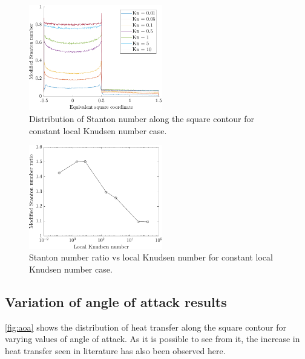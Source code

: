 \begin{figure}[H]
    \centering
    \includegraphics[width=0.52\textwidth]{Images/4. Results/local/stsec.pdf}
    \caption{Distribution of Stanton number along the square contour for constant local Knudsen number case.}
    \label{fig:localstsec}
\end{figure}

\begin{figure}[H]
    \centering
    \includegraphics[width=0.52\textwidth]{Images/4. Results/local/stkn.pdf}
    \caption{Stanton number ratio vs local Knudsen number for constant local Knudsen number case.}
    \label{fig:localstkn}
\end{figure}

\subsection{Variation of angle of attack results}

\autoref{fig:aoa} shows the distribution of heat transfer along the square contour for varying values of angle of attack. As it is possible to see from it, the increase in heat transfer seen in literature \cite{pallahrini, spartavalid} has also been observed here.


